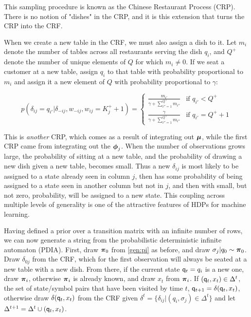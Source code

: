 This sampling procedure is known as the Chinese Restaurant Process (CRP).  There is no notion of "dishes" in the CRP, and it is this extension that turns the CRP into the CRF.

When we create a new table in the CRF, we must also assign a dish to it.    Let $m_i$ denote the number of tables across all restaurants serving the dish $q_i$, and $Q^+$ denote the number of unique elements of $Q$ for which $m_i \ne 0$.  If we seat a customer at a new table, assign $q_i$ to that table with probability proportional to $m_i$ and assign it a new element of $Q$ with probability proportional to $\gamma$:

\begin{equation}
p(\delta_{ij} = q_{i'} | \delta_{-ij}, w_{-ij}, w_{ij} = K^+_j + 1) = 
\begin{cases}
\frac{m_{i'}}{\gamma + \sum_{i'' = 1}^{Q^+} m_{i''} } & \text{if } q_{i'} < Q^+ \\
\frac{\gamma}{\gamma + \sum_{i'' = 1}^{Q^+} m_{i''} } & \text{if } q_{i'} = Q^+ + 1\label{crf:high}
\end{cases}
\end{equation}

This is {\em another} CRP, which comes as a result of integrating out $\bmu$, while the first CRP came from integrating out the $\bphi_j$.  When the number of observations grows large, the probability of sitting at a new table, and the probability of drawing a new dish given a new table, becomes small.  Thus a new $\delta_{ij}$ is most likely to be assigned to a state already seen in column $j$, then has some probability of being assigned to a state seen in another column but not in $j$, and then with small, but not zero, probability, will be assigned to a new state.  This coupling across multiple levels of generality is one of the attractive features of HDPs for machine learning.

Having defined a prior over a transition matrix with an infinite number of rows, we can now generate a string from the probabilistic deterministic infinite automaton (PDIA).  First, draw $\bpi_0$ from \eqref{gen:pi} as before, and draw $\sigma_j|q_0 \sim \bpi_0$.  Draw $\delta_{0j}$ from the CRF, which for the first observation will always be seated at a new table with a new dish.  From there, if the current state $\q_t = q_i$ is a new one, draw $\bpi_i$, otherwise $\bpi_i$ is already known, and draw $x_t$ from $\bpi_i$.  If $(\q_t,x_t) \in \Delta^t$, the set of state/symbol pairs that have been visited by time $t$, $\q_{t+1} = \delta(\q_t,x_t)$, otherwise draw $\delta(\q_t,x_t)$ from the CRF given $\delta^t = \{\delta_{ij}|(q_i,\sigma_j)\in\Delta^t\}$ and let $\Delta^{t+1} = \Delta^t \cup (\q_t,x_t)$.

